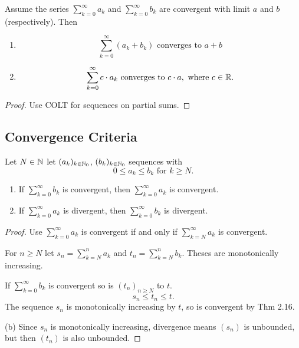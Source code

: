 \documentclass[10pt, a4paper]{article}
\newcommand{\infsum}[1][k = 1]{\sum_{#1}^{\infty}}
\begin{document}
\begin{theorem}
    Assume the series $\infsum[k = 0]a_k$ and $\infsum[k = 0]b_k$ are convergent with limit $a$ and $b$
    (respectively).
    Then
    \begin{enumerate}[label = (\alph*)]
        \item
        \[
        \infsum[k = 0](a_k + b_k) \text{ converges to } a + b
        \]
        \item
        \[
        \infsum[k = 0]c\cdot a_k\text{ converges to } c \cdot a, \text{ where } c \in \R.
        \]
    \end{enumerate}
    \begin{proof}
        Use COLT for sequences on partial sums.
    \end{proof}
\end{theorem}

\subsection{Convergence Criteria}
\begin{theorem}
    Let $N \in \mathbb{N}$ let $(a_k)_{k \in \mathbb{N}_0}$, $(b_k)_{k \in \mathbb{N}_0}$ sequences with
    \[
    0 \leq a_k \leq b_k \text{ for } k \geq N.
    \]
    \begin{enumerate}[label = (\alph*)]
        \item If $\infsum[k = 0]b_k$ is convergent,
        then $\infsum[k = 0]a_k$ is convergent.
        \item If $\infsum[k = 0]a_k$ is divergent,
        then $\infsum[k = 0]b_k$ is divergent.
    \end{enumerate}
    \begin{proof}
        Use $\infsum[k = 0]a_k$ is convergent if and only if $\infsum[k = N]a_k$ is convergent.

        For $n \geq N$ let $s_n = \sum_{k = N}^{n}a_k$ and $t_n = \sum_{k = N}^{n}b_k$.
        Theses are monotonically increasing.

        If $\infsum[k = 0]b_k$ is convergent so is $(t_n)_{n \geq N}$ to $t$.
        \[
        s_n \leq t_n \leq t.
        \]
        The sequence $s_n$ is monotonically increasing by $t$,
        so is convergent by Thm 2.16.

        (b)
        Since $s_n$ is monotonically increasing,
        divergence means $(s_n)$ is unbounded,
        but then $(t_n)$ is also unbounded.
    \end{proof}
\end{theorem}
\end{document}
